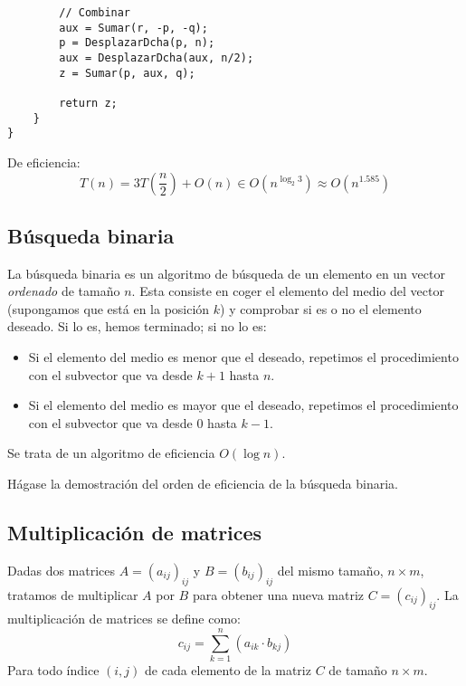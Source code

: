\begin{description}
\begin{listing}[H]
\begin{verbatim}
        // Combinar
        aux = Sumar(r, -p, -q);
        p = DesplazarDcha(p, n);
        aux = DesplazarDcha(aux, n/2);
        z = Sumar(p, aux, q);

        return z;
    }
}
            \end{verbatim}
        \end{listing}

        De eficiencia:
        \begin{equation*}
            T(n) = 3T\left(\dfrac{n}{2}\right) + O(n) \in O\left(n^{\log_2 3}\right) \approx O(n^{1.585})
        \end{equation*}
\end{description}

\subsection{Búsqueda binaria}
La búsqueda binaria es un algoritmo de búsqueda de un elemento en un vector \emph{ordenado} de tamaño $n$. Esta consiste en coger el elemento del medio del vector (supongamos que está en la posición $k$) y comprobar si es o no el elemento deseado. Si lo es, hemos terminado; si no lo es:
\begin{itemize}
    \item Si el elemento del medio es menor que el deseado, repetimos el procedimiento con el subvector que va desde $k+1$ hasta $n$.
    \item Si el elemento del medio es mayor que el deseado, repetimos el procedimiento con el subvector que va desde $0$ hasta $k-1$.
\end{itemize}
Se trata de un algoritmo de eficiencia $O(\log n)$.

\begin{ejercicio*}
    Hágase la demostración del orden de eficiencia de la búsqueda binaria.
\end{ejercicio*}

\subsection{Multiplicación de matrices}
Dadas dos matrices $A = (a_{ij})_{ij}$ y $B = (b_{ij})_{ij}$ del mismo tamaño, $n \times m$, tratamos de multiplicar $A$ por $B$ para obtener una nueva matriz $C = (c_{ij})_{ij}$. La multiplicación de matrices se define como:
\begin{equation*}
    c_{ij} = \sum_{k = 1}^n \left( a_{ik} \cdot b_{kj} \right)
\end{equation*}
Para todo índice $(i,j)$ de cada elemento de la matriz $C$ de tamaño $n \times m$.

